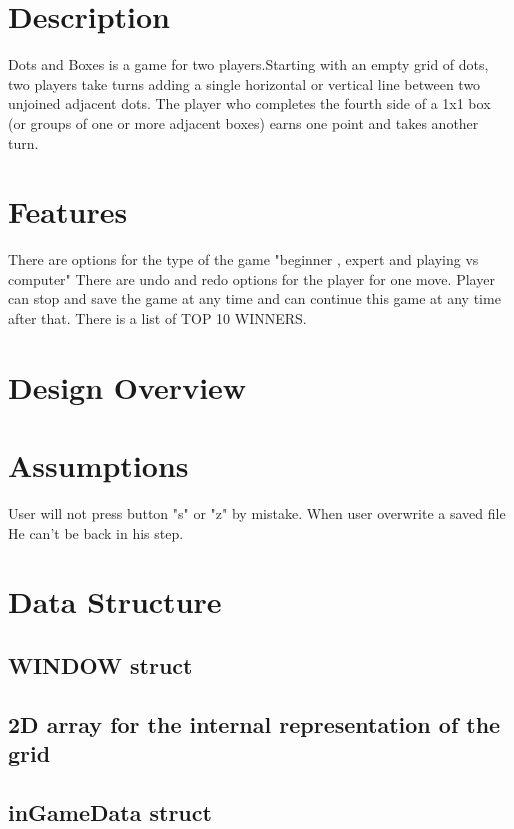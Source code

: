 \documentclass{article}
\begin{document}
	\section{Description}
	Dots and Boxes is a game for two players.Starting with an empty grid of dots,
        two players take turns adding a single horizontal or vertical line between two 
        unjoined adjacent dots. The player who completes the fourth side of a 1x1 box 
        (or groups of one or more adjacent boxes) earns one point and takes another turn.
	
	\section{Features}
        There are options for the type of the game "beginner , expert and playing vs computer" 
	There are undo and redo options for the player for one move.
        Player can stop and save the game at any time and can continue this game at any time after that.
        There is a list of TOP 10 WINNERS.
	
	\section{Design Overview}
	
	
	\section{Assumptions}
	User will not press button "s" or "z" by mistake.
	When user overwrite a saved file He can't be back in his step.
        
	\section{Data Structure}
		\subsection{WINDOW struct}
		
		\subsection{2D array for the internal representation of the grid}
		
		\subsection{inGameData struct}
		
\end{document}
